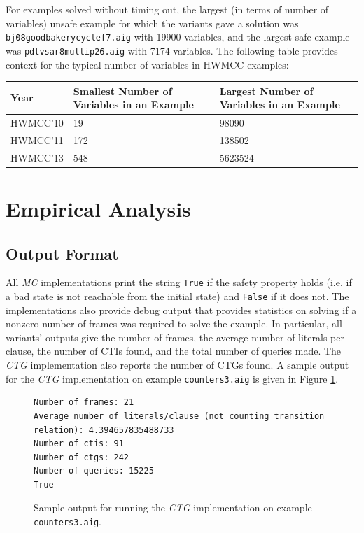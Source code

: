 \documentclass[12pt,a4paper,twoside,openright]{report}
\begin{document}
{{For examples solved without timing out,
the largest (in terms of number of variables) unsafe example for which the variants gave a
solution was \verb,bj08goodbakerycyclef7.aig, with 19900 variables,
and the largest safe example %
was \verb,pdtvsar8multip26.aig, with 7174 variables.
The following table provides context for the typical number of variables in HWMCC
examples:
\begin{center}
\begin{tabular}{|l | p{15em} | p{15em}|}
\hline
Year & Smallest Number of Variables in an Example & Largest Number of Variables in an
Example \\
\hline
HWMCC'10 & 19 & 98090\\
HWMCC'11 & 172 & 138502\\
HWMCC'13 & 548 & 5623524\\
\hline
\end{tabular}
\end{center}

\section{Empirical Analysis}
\label{eval:analysis}

\subsection{Output Format}
\label{eval:output}

All \emph{MC} implementations print the string \verb,True, if the safety
property holds (i.e. if a bad state is not reachable from the initial state) and
\verb,False, if it does not. The implementations also provide debug output that provides
statistics on solving if a nonzero number of frames was required to solve the example.
In particular, all variants' outputs give the number of frames, the average number of
literals per clause, the number of CTIs found, and the total number of queries made. The {\it CTG} implementation also reports the number of CTGs found. A sample output
for the {\it CTG} implementation on example \verb,counters3.aig,
is given in Figure \ref{sampleoutput}.

\begin{figure}[t]
\centering
\begin{lstlisting}[keywordstyle = \ttfamily, basicstyle = \footnotesize\ttfamily]
Number of frames: 21
Average number of literals/clause (not counting transition relation): 4.394657835488733
Number of ctis: 91
Number of ctgs: 242
Number of queries: 15225
True
\end{lstlisting}
\caption{Sample output for running the \emph{CTG} implementation on example {\tt counters3.aig}.}
\label{sampleoutput}
\end{figure}

}}
\end{document}
